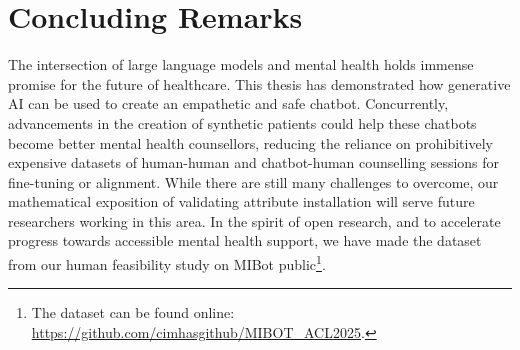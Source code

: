 \section{Concluding Remarks}

The intersection of large language models and mental health holds immense promise for the future of healthcare. This thesis has demonstrated how generative AI can be used to create an empathetic and safe chatbot. Concurrently, advancements in the creation of synthetic patients could help these chatbots become better mental health counsellors, reducing the reliance on prohibitively expensive datasets of human-human and chatbot-human counselling sessions for fine-tuning or alignment. While there are still many challenges to overcome, our mathematical exposition of validating attribute installation will serve future researchers working in this area. In the spirit of open research, and to accelerate progress towards accessible mental health support, we have made the dataset from our human feasibility study on MIBot public\footnote{The dataset can be found online: \url{https://github.com/cimhasgithub/MIBOT\_ACL2025}.}.